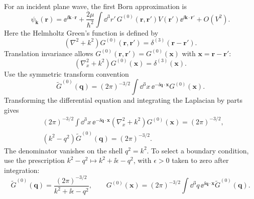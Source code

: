 For an incident plane wave, the first Born approximation is
\[
 \psi_{\mathbf k}(\mathbf r)=\ee^{\ii\mathbf k\cdot\mathbf r}
 +\frac{2\mu}{\hbar^2}\int\dd^3r'\,
 G^{(0)}(\mathbf r,\mathbf r')V(\mathbf r')
 \ee^{\ii\mathbf k\cdot\mathbf r'}+O(V^2).
\]
Here the Helmholtz Green's function is defined by
\[
 (\nabla^2+k^2)G^{(0)}(\mathbf r,\mathbf r')
 =\delta^{(3)}(\mathbf r-\mathbf r').
\]
Translation invariance allows $G^{(0)}(\mathbf r,\mathbf r')=
G^{(0)}(\mathbf x)$ with $\mathbf x=\mathbf r-\mathbf r'$:
\[
 (\nabla_x^2+k^2)G^{(0)}(\mathbf x)=\delta^{(3)}(\mathbf x).
\]
Use the symmetric transform convention
\[
 \widetilde G^{(0)}(\mathbf q)
  =(2\pi)^{-3/2}\int\dd^3x\,
     \ee^{-\ii\mathbf q\cdot\mathbf x}G^{(0)}(\mathbf x).
\]
Transforming the differential equation and integrating the Laplacian
by parts gives
\begin{align*}
 &(2\pi)^{-3/2}\int\dd^3x\,
 \ee^{-\ii\mathbf q\cdot\mathbf x}(\nabla_x^2+k^2)G^{(0)}(\mathbf x)
 =(2\pi)^{-3/2},\\
 &(k^2-q^2)\widetilde G^{(0)}(\mathbf q)=(2\pi)^{-3/2}.
\end{align*}
The denominator vanishes on the shell $q^2=k^2$. To select a boundary
condition, use the prescription $k^2-q^2\mapsto k^2+\ii\epsilon-q^2$,
with $\epsilon>0$ taken to zero after integration:
\[
 \widetilde G^{(0)}(\mathbf q)
 =\frac{(2\pi)^{-3/2}}{k^2+\ii\epsilon-q^2},\qquad
 G^{(0)}(\mathbf x)=(2\pi)^{-3/2}
 \int\dd^3q\,\ee^{\ii\mathbf q\cdot\mathbf x}
 \widetilde G^{(0)}(\mathbf q).
\]
